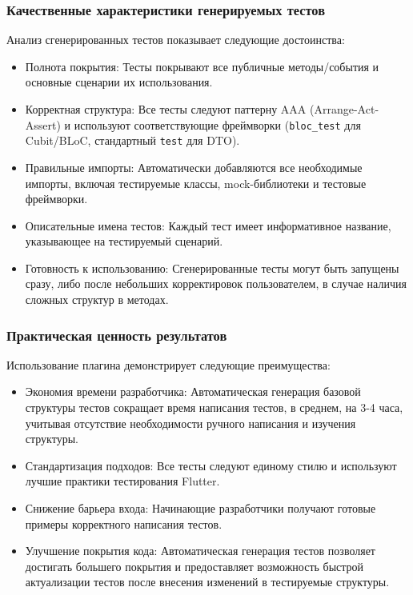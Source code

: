 \documentclass[14pt, russian]{scrartcl}
\begin{document}
\subsubsection{Качественные характеристики генерируемых тестов}

Анализ сгенерированных тестов показывает следующие достоинства:

\begin{itemize}
    \item Полнота покрытия: Тесты покрывают все публичные методы/события и основные сценарии их использования.
    \item Корректная структура: Все тесты следуют паттерну AAA (Arrange-Act-Assert) и используют соответствующие фреймворки (\texttt{bloc\_test} для Cubit/BLoC, стандартный \texttt{test} для DTO).
    \item Правильные импорты: Автоматически добавляются все необходимые импорты, включая тестируемые классы, mock-библиотеки и тестовые фреймворки.
    \item Описательные имена тестов: Каждый тест имеет информативное название, указывающее на тестируемый сценарий.
    \item Готовность к использованию: Сгенерированные тесты могут быть запущены сразу, либо после небольших корректировок пользователем, в случае наличия сложных структур в методах.
\end{itemize}

\subsubsection{Практическая ценность результатов}

Использование плагина демонстрирует следующие преимущества:

\begin{itemize}
    \item Экономия времени разработчика: Автоматическая генерация базовой структуры тестов сокращает время написания тестов, в среднем, на 3-4 часа, учитывая отсутствие необходимости ручного написания и изучения структуры.
    \item Стандартизация подходов: Все тесты следуют единому стилю и используют лучшие практики тестирования Flutter.
    \item Снижение барьера входа: Начинающие разработчики получают готовые примеры корректного написания тестов.
    \item Улучшение покрытия кода: Автоматическая генерация тестов позволяет достигать большего покрытия и предоставляет возможность быстрой актуализации тестов после внесения изменений в тестируемые структуры.
\end{itemize}
\end{document}
